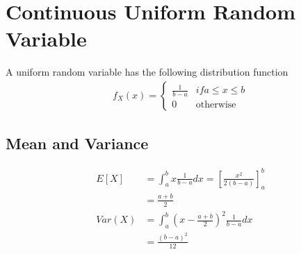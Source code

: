 \documentclass[../../probability-notes.tex]{subfiles}
\begin{document}
    \section{Continuous Uniform Random Variable}
    A uniform random variable has the following distribution function
    \begin{align*}
        f_{X}(x) = \begin{cases} \frac{1}{b-a} &\mbox{$if a \leq x \leq b$}\\
                                    0 &\mbox{otherwise} \end{cases}
    \end{align*}

    \subsection{Mean and Variance}
    \begin{align*}
        E[X] &= \int_{a}^{b} x \frac{1}{b-a} dx = [\frac{x^{2}}{2(b-a)}]_{a}^{b}\\
            &= \frac{a+b}{2}\\
        Var(X) &= \int_{a}^{b} (x - \frac{a+b}{2})^{2} \frac{1}{b-a} dx \\
            &= \frac{(b-a)^{2}}{12}
    \end{align*}
\end{document}
